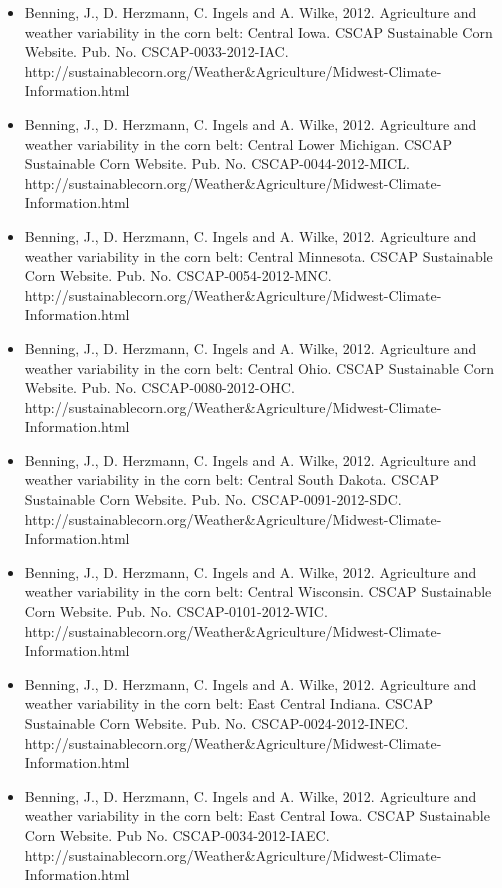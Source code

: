 \begin{itemize}
\item Benning, J., D. Herzmann, C. Ingels and A. Wilke, 2012. Agriculture and weather variability in the corn belt: Central Iowa. CSCAP Sustainable Corn Website. Pub. No. CSCAP-0033-2012-IAC. http://sustainablecorn.org/Weather\&Agriculture/Midwest-Climate-Information.html

\item Benning, J., D. Herzmann, C. Ingels and A. Wilke, 2012. Agriculture and weather variability in the corn belt: Central Lower Michigan. CSCAP Sustainable Corn Website. Pub. No. CSCAP-0044-2012-MICL. http://sustainablecorn.org/Weather\&Agriculture/Midwest-Climate-Information.html

\item Benning, J., D. Herzmann, C. Ingels and A. Wilke, 2012. Agriculture and weather variability in the corn belt: Central Minnesota. CSCAP Sustainable Corn Website. Pub. No. CSCAP-0054-2012-MNC. http://sustainablecorn.org/Weather\&Agriculture/Midwest-Climate-Information.html

\item Benning, J., D. Herzmann, C. Ingels and A. Wilke, 2012. Agriculture and weather variability in the corn belt: Central Ohio. CSCAP Sustainable Corn Website. Pub. No. CSCAP-0080-2012-OHC. http://sustainablecorn.org/Weather\&Agriculture/Midwest-Climate-Information.html

\item Benning, J., D. Herzmann, C. Ingels and A. Wilke, 2012. Agriculture and weather variability in the corn belt: Central South Dakota. CSCAP Sustainable Corn Website. Pub. No. CSCAP-0091-2012-SDC. http://sustainablecorn.org/Weather\&Agriculture/Midwest-Climate-Information.html

\item Benning, J., D. Herzmann, C. Ingels and A. Wilke, 2012. Agriculture and weather variability in the corn belt: Central Wisconsin. CSCAP Sustainable Corn Website. Pub. No. CSCAP-0101-2012-WIC. http://sustainablecorn.org/Weather\&Agriculture/Midwest-Climate-Information.html

\item Benning, J., D. Herzmann, C. Ingels and A. Wilke, 2012. Agriculture and weather variability in the corn belt: East Central Indiana. CSCAP Sustainable Corn Website. Pub. No. CSCAP-0024-2012-INEC. http://sustainablecorn.org/Weather\&Agriculture/Midwest-Climate-Information.html

\item Benning, J., D. Herzmann, C. Ingels and A. Wilke, 2012. Agriculture and weather variability in the corn belt: East Central Iowa. CSCAP Sustainable Corn Website. Pub No. CSCAP-0034-2012-IAEC. http://sustainablecorn.org/Weather\&Agriculture/Midwest-Climate-Information.html


\end{itemize}
